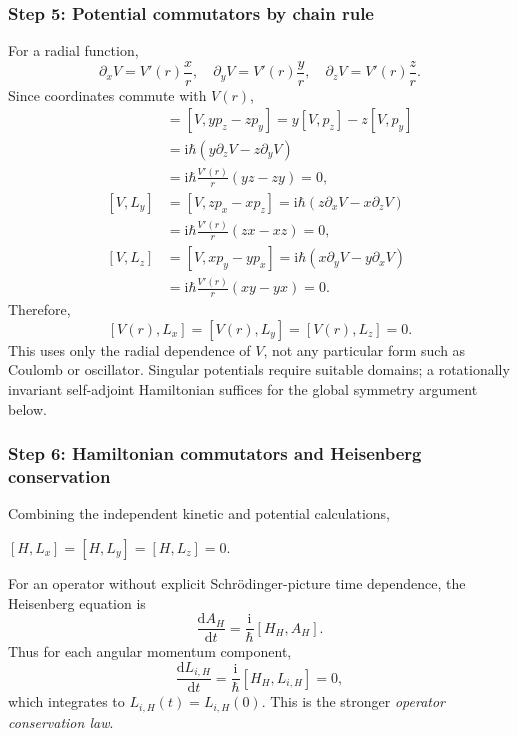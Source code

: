 \documentclass[11pt,a4paper]{article}
\newcommand{\key}[1]{\begin{resultbox}\centering\(\displaystyle #1\)\end{resultbox}}
\newcommand{\dd}{\mathrm{d}}
\newcommand{\iu}{\mathrm{i}}
\newcommand{\p}{\partial}
\begin{document}
\subsubsection*{Step 5: Potential commutators by chain rule}
For a radial function,
\begin{equation}\boxed{\p_xV=V'(r)\frac xr,\quad \p_yV=V'(r)\frac yr,\quad \p_zV=V'(r)\frac zr.}\end{equation}
Since coordinates commute with \(V(r)\),
\begin{align}
[V,L_x]&=[V,yp_z-zp_y]=y[V,p_z]-z[V,p_y]\\
&=\iu\hbar(y\p_zV-z\p_yV)\\
&=\iu\hbar\frac{V'(r)}r(yz-zy)=0,\\[3pt]
[V,L_y]&=[V,zp_x-xp_z]=\iu\hbar(z\p_xV-x\p_zV)\\
&=\iu\hbar\frac{V'(r)}r(zx-xz)=0,\\[3pt]
[V,L_z]&=[V,xp_y-yp_x]=\iu\hbar(x\p_yV-y\p_xV)\\
&=\iu\hbar\frac{V'(r)}r(xy-yx)=0.
\end{align}
Therefore,
\begin{equation}\boxed{[V(r),L_x]=[V(r),L_y]=[V(r),L_z]=0.}\end{equation}
This uses only the radial dependence of \(V\), not any particular form such as Coulomb or oscillator. Singular potentials require suitable domains; a rotationally invariant self-adjoint Hamiltonian suffices for the global symmetry argument below.

\subsubsection*{Step 6: Hamiltonian commutators and Heisenberg conservation}
Combining the independent kinetic and potential calculations,
\key{\boxed{[H,L_x]=[H,L_y]=[H,L_z]=0.}}
For an operator without explicit Schr\"odinger-picture time dependence, the Heisenberg equation is
\begin{equation}\boxed{\frac{\dd A_H}{\dd t}=\frac{\iu}{\hbar}[H_H,A_H].}\end{equation}
Thus for each angular momentum component,
\begin{equation}\frac{\dd L_{i,H}}{\dd t}=\frac{\iu}{\hbar}[H_H,L_{i,H}]=0,\end{equation}
which integrates to \(L_{i,H}(t)=L_{i,H}(0)\). This is the stronger \emph{operator conservation law}.
\end{document}
